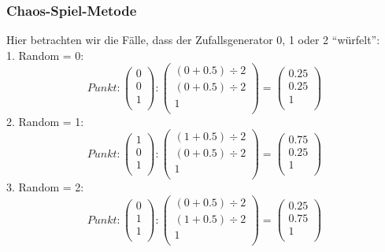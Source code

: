\documentclass[]{article}
\begin{document}
\subsubsection*{Chaos-Spiel-Metode}
Hier betrachten wir die Fälle, dass der Zufallsgenerator 0, 1 oder 2 "`würfelt"':\\
1. Random = 0:   
\[ 
Punkt:
\begin{pmatrix}
0 \\
0 \\
1 \\
\end{pmatrix}
:
\begin{pmatrix}
(0 + 0.5) \div 2 \\
(0 + 0.5) \div 2 \\
1 \\
\end{pmatrix}
=
 \begin{pmatrix}
 	0.25\\
 	0.25\\
 	1 \\
 \end{pmatrix} 
 \]
  2. Random = 1: 
 \[ 
 Punkt:
 \begin{pmatrix}
 1 \\
 0 \\
 1 \\
 \end{pmatrix}
 : 
 \begin{pmatrix}
 (1 + 0.5) \div 2 \\
 (0 + 0.5) \div 2 \\
 1 \\
 \end{pmatrix}
 =
 \begin{pmatrix}
 0.75\\
 0.25\\
 1 \\
 \end{pmatrix} 
 \]
 3. Random = 2:   
 \[ 
  Punkt:
  \begin{pmatrix}
  0 \\
  1 \\
  1 \\
  \end{pmatrix}
  : 
 \begin{pmatrix}
 (0 + 0.5) \div 2 \\
 (1 + 0.5) \div 2 \\
 1 \\
 \end{pmatrix}
 =
 \begin{pmatrix}
 0.25\\
 0.75\\
 1 \\
 \end{pmatrix} 
 \]
 
\end{document}
